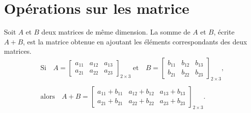 \documentclass[12pt,a4paper]{book}
\numberwithin{definition}{chapter}
\theoremstyle{plain}
\begin{document}
	\section{Opérations sur les matrice}
	\begin{definition}
		Soit $A$ et $B$ deux matrices de même dimension. La somme de $A$ et $B$, écrite $A+B$, est la matrice obtenue en ajoutant les éléments correspondants des deux matrices.
		\begin{equation*}
			\begin{aligned}
				&\text{Si}\quad A=\begin{bmatrix}
					a_{11} & a_{12} & a_{13}\\
					a_{21} & a_{22}  & a_{23}
				\end{bmatrix}_{2\times 3}\;\text{et}\quad
				B=\begin{bmatrix}
					b_{11} & b_{12} & b_{13}\\
					b_{21} & b_{22}  & b_{23}
				\end{bmatrix}_{2\times 3},
				\\ \ \\
				&\text{alors}\quad A+B=\begin{bmatrix}
					a_{11}+b_{11} & a_{12}+b_{12} & a_{13}+b_{13}\\
					a_{21}+b_{21} & a_{22}+b_{22}  & a_{23}+b_{23}
				\end{bmatrix}_{2\times 3}.
			\end{aligned}
		\end{equation*}
	\end{definition}
\end{document}
